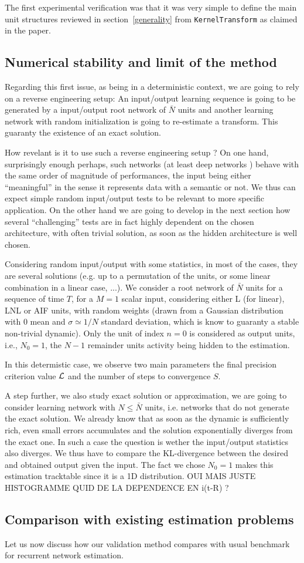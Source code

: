 The first experimental verification was that it was very simple to define the main unit structures reviewed in section~\ref{generality} from {\tt KernelTransform} as claimed in the paper.

\subsection*{Numerical stability and limit of the method}

Regarding this first issue, as being in a deterministic context, we are going to rely on a reverse engineering setup: An input/output learning sequence is going to be generated by a input/output root network of $\bar{N}$ units and another learning network with random initialization is going to re-estimate a transform. This guaranty the existence of an exact solution. 

How revelant is it to use such a reverse engineering setup ? On one hand, surprisingly enough perhaps, such networks (at least deep networks \cite{Zhang2016Understanding}) behave with the same order of magnitude of performances, the input being either ``meaningful'' in the sense it represents data with a semantic or not. We thus can expect simple random input/output tests to be relevant to more specific application. On the other hand we are going to develop in the next section how several ``challenging'' tests are in fact highly dependent on the chosen architecture, with often trivial solution, as soon as the hidden architecture is well chosen.

Considering random input/output with some statistics, in most of the cases, they are several solutions (e.g. up to a permutation of the units, or some linear combination in a linear case, ...). We consider a root network of $\bar{N}$ units for a sequence of time $T$, for a $M=1$ scalar input, considering either L (for linear), LNL or AIF units, with random weights (drawn from a Gaussian distribution with $0$ mean and $\sigma \simeq 1/N$ standard deviation, which is know to guaranty a stable non-trivial dynamic). Only the unit of index $n=0$ is considered as output units, i.e., $N_0 = 1$, the $N-1$ remainder units activity being hidden to the estimation.

In this determistic case, we observe two main parameters the final precision criterion value ${\cal L}$ and the number of steps to convergence $S$. 

A step further, we also study exact solution or approximation, we are going to consider learning network with $N \leq \bar{N}$ units, i.e. networks that do not generate the exact solution. We already know that as soon as the dynamic is sufficiently rich, even small errors accumulates and the solution exponentially diverges from the exact one. In such a case the question is wether the input/output statistics also diverges. We thus have to compare the KL-divergence between the desired and obtained output given the input. The fact we chose $N_0 = 1$ makes this estimation tracktable since it is a 1D distribution. OUI MAIS JUSTE HISTOGRAMME QUID DE LA DEPENDENCE EN i(t-R) ?

\subsection*{Comparison with existing estimation problems}

Let us now discuss how our validation method compares with usual benchmark for recurrent network estimation.
